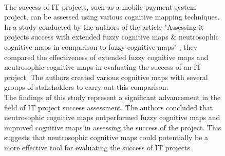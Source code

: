 \documentclass{article}
\begin{document}
\begin{figure}[!t]
\begin{minipage}{0.49\textwidth}
            ~\\
            The success of IT projects, such as a mobile payment system project, can be assessed using various cognitive mapping techniques.\\
            In a study conducted by the authors of the article "{}Assessing it projects success with extended fuzzy cognitive maps \& neutrosophic cognitive maps in comparison to fuzzy cognitive maps"{} \cite{litlink20}, they compared the effectiveness of extended fuzzy cognitive maps and neutrosophic cognitive maps in evaluating the success of an IT project. The authors created various cognitive maps with several groups of stakeholders to carry out this comparison.\\
            The findings of this study represent a significant advancement in the field of IT project success assessment. The authors concluded that neutrosophic cognitive maps outperformed fuzzy cognitive maps and improved cognitive maps in assessing the success of the project. This suggests that neutrosophic cognitive maps could potentially be a more effective tool for evaluating the success of IT projects.\\
            ~\\
            ~\\
            ~\\
            ~\\
            ~\\
            ~\\
            ~\\
            ~\\
            ~\\
            ~\\
            ~\\
            ~\\
            ~\\
            ~\\
            ~\\
            ~\\
            ~\\
            ~\\
            ~\\
            ~\\
            ~\\
            ~\\
            ~\\
            ~\\
            ~\\

\end{minipage}
\end{figure}
\end{document}

